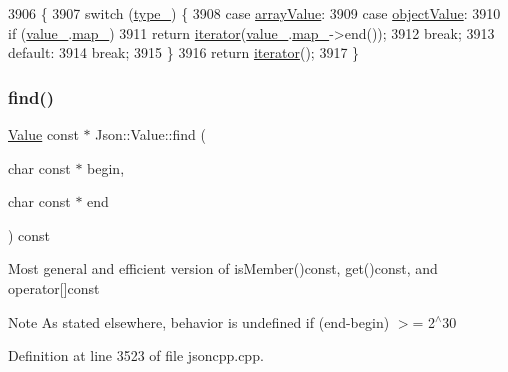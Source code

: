 \begin{DoxyCode}
3906                          \{
3907   \textcolor{keywordflow}{switch} (\hyperlink{class_json_1_1_value_abd222c2536dc88bf330dedcd076d2356}{type\_}) \{
3908   \textcolor{keywordflow}{case} \hyperlink{namespace_json_a7d654b75c16a57007925868e38212b4eadc8f264f36b55b063c78126b335415f4}{arrayValue}:
3909   \textcolor{keywordflow}{case} \hyperlink{namespace_json_a7d654b75c16a57007925868e38212b4eae8386dcfc36d1ae897745f7b4f77a1f6}{objectValue}:
3910     \textcolor{keywordflow}{if} (\hyperlink{class_json_1_1_value_aef578244546212705b9f81eb84d7e151}{value\_}.\hyperlink{union_json_1_1_value_1_1_value_holder_a1e7a5b86d4f52234f55c847ad1ce389a}{map\_})
3911       \textcolor{keywordflow}{return} \hyperlink{class_json_1_1_value_a341cdf2e01f8b3c5b7317aa2f0768c53}{iterator}(\hyperlink{class_json_1_1_value_aef578244546212705b9f81eb84d7e151}{value\_}.\hyperlink{union_json_1_1_value_1_1_value_holder_a1e7a5b86d4f52234f55c847ad1ce389a}{map\_}->end());
3912     \textcolor{keywordflow}{break};
3913   \textcolor{keywordflow}{default}:
3914     \textcolor{keywordflow}{break};
3915   \}
3916   \textcolor{keywordflow}{return} \hyperlink{class_json_1_1_value_a341cdf2e01f8b3c5b7317aa2f0768c53}{iterator}();
3917 \}
\end{DoxyCode}
\mbox{\label{class_json_1_1_value_afb007b9ce9b2cf9d5f667a07e5e0349f}} 
\subsubsection{\texorpdfstring{find()}{find()}}
{\footnotesize\ttfamily \hyperlink{class_json_1_1_value}{Value} const  $\ast$ Json\+::\+Value\+::find (\begin{DoxyParamCaption}\item[{char const $\ast$}]{begin,  }\item[{char const $\ast$}]{end }\end{DoxyParamCaption}) const}

Most general and efficient version of is\+Member()const, get()const, and operator\mbox{[}\mbox{]}const \begin{DoxyNote}{Note}
As stated elsewhere, behavior is undefined if (end-\/begin) $>$= 2$^\wedge$30 
\end{DoxyNote}


Definition at line 3523 of file jsoncpp.\+cpp.



